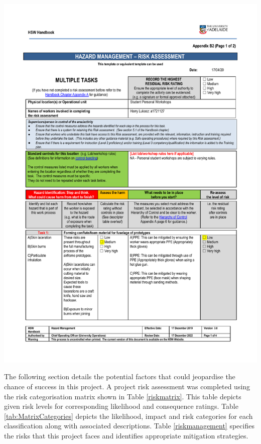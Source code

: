 \begin{appendices}
\includegraphics[page = 4,width=1\textwidth]{Figures/SOP.pdf}

\clearpage

The following section details the potential factors that could jeopardise the chance of success in this project. A project risk assessment was completed using the risk categorisation matrix shown in Table \ref{riskmatrix}. This table depicts given risk levels for corresponding likelihood and consequence ratings. Table \ref{tab:MatrixCategories} depicts the likelihood, impact and risk categories for each classification along with associated descriptions. Table \ref{riskmanagement} specifies the risks that this project faces and identifies appropriate mitigation strategies.



\end{appendices}
